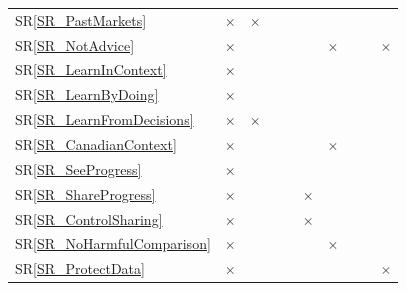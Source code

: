 \documentclass[12pt]{article}
\newcommand{\srref}[1]{SR\ref{#1}}
\begin{document}
\begin{table}[H]
\begin{tabular}{l*{9}{c}}
    \srref{SR_PastMarkets}         & $\times$                                 & $\times$     &              &              &              &              &              &              &              \\
    \srref{SR_NotAdvice}           & $\times$                                 &              &              &              &              & $\times$     &              &              & $\times$     \\
    \srref{SR_LearnInContext}      & $\times$                                 &              &              &              &              &              &              &              &              \\
    \srref{SR_LearnByDoing}        & $\times$                                 &              &              &              &              &              &              &              &              \\
    \srref{SR_LearnFromDecisions}  & $\times$                                 & $\times$     &              &              &              &              &              &              &              \\
    \srref{SR_CanadianContext}     & $\times$                                 &              &              &              &              & $\times$     &              &              &              \\
    \srref{SR_SeeProgress}         & $\times$                                 &              &              &              &              &              &              &              &              \\
    \srref{SR_ShareProgress}       & $\times$                                 &              &              &              & $\times$     &              &              &              &              \\
    \srref{SR_ControlSharing}      & $\times$                                 &              &              &              & $\times$     &              &              &              &              \\
    \srref{SR_NoHarmfulComparison} & $\times$                                 &              &              &              &              & $\times$     &              &              &              \\
    \srref{SR_ProtectData}         & $\times$                                 &              &              &              &              &              &              &              & $\times$     \\

\end{tabular}
\end{table}
\end{document}
